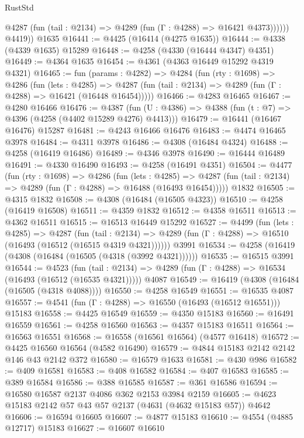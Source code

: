 \begin{lexlean}{RustStd}
\begin{coremodule}
{\begin{coremodule}
{{{{{{{{{{{{{{{{              @4287 (fun (tail : @2134) => @4289 (fun (Γ : @4288) => @16421 @4373))))))
        @4419))
    @1635
@16441 := @4425 (@16414 (@4275 @1635))
@16444 := @4338 (@4339 @1635) @15289
@16448 := @4258 (@4330 (@16444 @4347) @4351)
@16449 := @4364 @1635
@16454 := @4361 (@4363 @16449 @15292 @4319 @4321)
@16465 := fun (params : @4282) =>
  @4284
    (fun (rty : @1698) =>
    @4286
      (fun (lets : @4285) =>
      @4287 (fun (tail : @2134) => @4289 (fun (Γ : @4288) => @16421 (@16448 @16454)))))
@16466 := @4283 @16465
@16467 := @4280 @16466
@16476 := @4387
    (fun (U : @4386) => @4388 (fun (t : @7) => @4396 (@4258 (@4402 @15289 @4276) @4413)))
@16479 := @16441 (@16467 @16476) @15287
@16481 := @4243 @16466 @16476
@16483 := @4474 @16465 @3978
@16484 := @4311 @3978
@16486 := @4308 (@16484 @4324)
@16488 := @4258 (@16419 @16486)
@16489 := @4346 @3978
@16490 := @16444 @16489
@16491 := @4330 @16490
@16493 := @4258 (@16491 @4351)
@16504 := @4477
    (fun (rty : @1698) =>
    @4286
      (fun (lets : @4285) =>
      @4287 (fun (tail : @2134) => @4289 (fun (Γ : @4288) => @16488 (@16493 @16454)))))
    @1832
@16505 := @4315 @1832
@16508 := @4308 (@16484 (@16505 @4323))
@16510 := @4258 (@16419 @16508)
@16511 := @4359 @1832
@16512 := @4358 @16511
@16513 := @4362 @16511
@16515 := @16513 @16449 @15292
@16527 := @4499
    (fun (lets : @4285) =>
    @4287
      (fun (tail : @2134) =>
      @4289 (fun (Γ : @4288) => @16510 (@16493 (@16512 (@16515 @4319 @4321))))))
    @3991
@16534 := @4258 (@16419 (@4308 (@16484 (@16505 (@4318 (@3992 @4321))))))
@16535 := @16515 @3991
@16544 := @4523
    (fun (tail : @2134) => @4289 (fun (Γ : @4288) => @16534 (@16493 (@16512 (@16535 @4321)))))
    @4087
@16549 := @16419 (@4308 (@16484 (@16505 (@4318 @4088))))
@16550 := @4258 @16549
@16551 := @16535 @4087
@16557 := @4541 (fun (Γ : @4288) => @16550 (@16493 (@16512 @16551))) @15183
@16558 := @4425 @16549
@16559 := @4350 @15183
@16560 := @16491 @16559
@16561 := @4258 @16560
@16563 := @4357 @15183 @16511
@16564 := @16563 @16551
@16568 := @16558 (@16561 @16564) (@4577 @16418)
@16572 := @4425 @16560 @16564 (@4582 @16490)
@16579 := @4844 @15183 @2142 @2142 @146 @43 @2142 @372
@16580 := @16579 @1633
@16581 := @430 @986
@16582 := @409 @16581
@16583 := @408 @16582
@16584 := @407 @16583
@16585 := @389 @16584
@16586 := @388 @16585
@16587 := @361 @16586
@16594 := @16580 @16587 @2137 @4086 @362 @2153 @3984 @2159
@16605 := @4623 @15183 @2142 @57 @43 @57 @2137 (@4631 (@4632 @15183 @57)) @4642
@16606 := @16594 @16605
@16607 := @4877 @15183
@16610 := @4554 (@4885 @12717) @15183
@16627 := @16607
    @16610
}}}}}}}}}}}}}}}}
\end{coremodule}}
\end{coremodule}
\end{lexlean}
